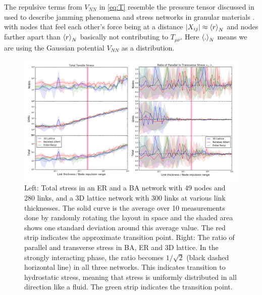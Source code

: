 \documentclass[endfloats,nofootinbib,preprint,floatfix,titlepage,superscriptaddress,linenumbers]{revtex4-1} %
\begin{document}
The repulsive terms from $V_{NN}$ in \eqref{eq:T} resemble the pressure tensor discussed in \citep{stillinger1984packing} used to describe jamming phenomena and stress networks in granular materials  \citep{o2002random,o2003jamming}.  
with nodes that feel each other's force being at a distance $|X_{ij}|\approx \left<r\right>_N$ and nodes farther apart than $\left<r\right>_N$ basically not contributing to $T_{\mu\nu}$. 
Here  $\left<.\right>_N$ means we are using the Gaussian potential $V_{NN}$ as a distribution. 
\begin{figure}
    \centering
    \includegraphics[width=1\columnwidth]{fig-09-19/stress3.png}
    \caption{\scriptsize Left: Total stress in an ER and a BA network with 49 nodes and 280 links, and a 3D lattice network with 300 links at various link thicknesses. 
    The solid curve is the average over 10 measurements done by randomly rotating the layout in space and the  shaded area shows one standard deviation around this average value. 
    The red strip indicates the approximate transition point.   
    Right: The ratio of parallel and transverse stress in BA, ER and 3D lattice. In the strongly interacting phase, the ratio becomes $1/\sqrt{2}$ (black dashed horizontal line) in  all three networks. 
    This indicates transition to hydrostatic stress, meaning that stress is uniformly distributed in all direction like a fluid. 
    The green strip indicates the transition point.}
    \label{fig:stress2}
\end{figure}
\end{document}
